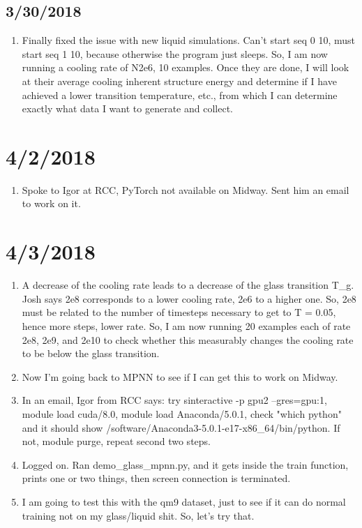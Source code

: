\documentclass[12pt,reqno]{amsart}
\numberwithin{equation}{section}
\begin{document}
\subsection{3/30/2018}

\begin{enumerate}
\item Finally fixed the issue with new liquid simulations.  Can't start seq 0 10, must start seq 1 10, because otherwise the program just sleeps.  So, I am now running a cooling rate of N2e6, 10 examples.  Once they are done, I will look at their average cooling inherent structure energy and determine if I have achieved a lower transition temperature, etc., from which I can determine exactly what data I want to generate and collect.  
\end{enumerate}

\section{4/2/2018}

\begin{enumerate}
\item Spoke to Igor at RCC, PyTorch not available on Midway.  Sent him an email to work on it.  
\end{enumerate}

\section{4/3/2018}

\begin{enumerate}
\item A decrease of the cooling rate leads to a decrease of the glass transition T\_g.  Josh says 2e8 corresponds to a lower cooling rate, 2e6 to a higher one.  So, 2e8 must be related to the number of timesteps necessary to get to T = 0.05, hence more steps, lower rate.  So, I am now running 20 examples each of rate 2e8, 2e9, and 2e10 to check whether this measurably changes the cooling rate to be below the glass transition.  
\item Now I'm going back to MPNN to see if I can get this to work on Midway.  
\item In an email, Igor from RCC says: try sinteractive -p gpu2 --gres=gpu:1, module load cuda/8.0, module load Anaconda/5.0.1, check "which python" and it should show /software/Anaconda3-5.0.1-e17-x86\_64/bin/python.  If not, module purge, repeat second two steps.  
\item Logged on.  Ran demo\_glass\_mpnn.py, and it gets inside the train function, prints one or two things, then screen connection is terminated.
\item I am going to test this with the qm9 dataset, just to see if it can do normal training not on my glass/liquid shit.  So, let's try that.  
\end{enumerate}
\end{document}
